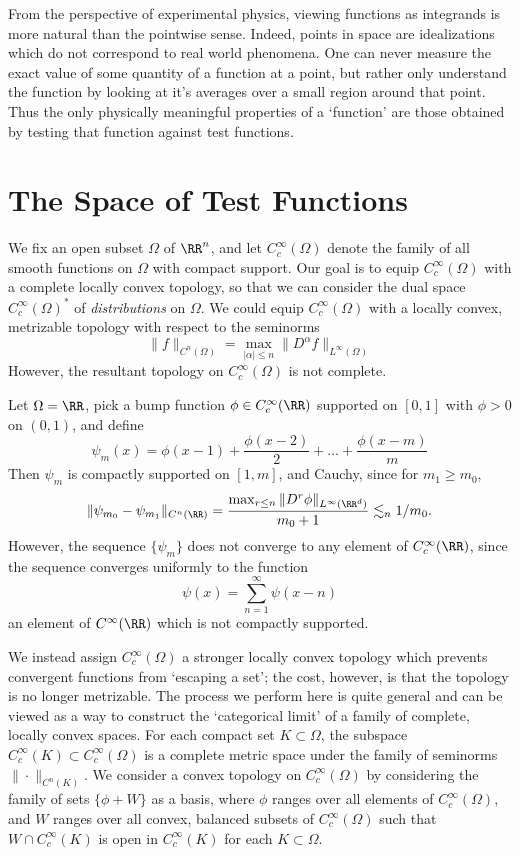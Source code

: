 \begin{remark}
  From the perspective of experimental physics, viewing functions as integrands is more natural than the pointwise sense. Indeed, points in space are idealizations which do not correspond to real world phenomena. One can never measure the exact value of some quantity of a function at a point, but rather only understand the function by looking at it's averages over a small region around that point. Thus the only physically meaningful properties of a `function' are those obtained by testing that function against test functions.
\end{remark}

\section{The Space of Test Functions}

We fix an open subset $\Omega$ of $\RR^n$, and let $C_c^\infty(\Omega)$ denote the family of all smooth functions on $\Omega$ with compact support. Our goal is to equip $C_c^\infty(\Omega)$ with a complete locally convex topology, so that we can consider the dual space $C_c^\infty(\Omega)^*$ of \emph{distributions} on $\Omega$. We could equip $C_c^\infty(\Omega)$ with a locally convex, metrizable topology with respect to the seminorms
%
\[ \| f \|_{C^n(\Omega)} = \max_{|\alpha| \leq n} \| D^\alpha f \|_{L^\infty(\Omega)} \]
%
However, the resultant topology on $C_c^\infty(\Omega)$ is not complete.

\begin{example}
    Let $\Omega = \RR$, pick a bump function $\phi \in C_c^\infty(\RR)$ supported on $[0,1]$ with $\phi > 0$ on $(0,1)$, and define
    \[ \psi_m(x) = \phi(x-1) + \frac{\phi(x-2)}{2} + \dots + \frac{\phi(x-m)}{m} \]
    Then $\psi_m$ is compactly supported on $[1,m]$, and Cauchy, since for $m_1 \geq m_0$,
    \[ \| \psi_{m_0} - \psi_{m_1} \|_{C^n(\RR)} = \frac{ \max_{r \leq n} \| D^r \phi \|_{L^\infty(\RR^d)}}{m_0+1} \lesssim_n 1/m_0. \]
    However, the sequence $\{ \psi_m \}$ does not converge to any element of $C_c^\infty(\RR)$, since the sequence converges uniformly to the function
    \[ \psi(x) = \sum_{n = 1}^\infty \psi(x-n) \]
    an element of $C^\infty(\RR)$ which is not compactly supported.
\end{example}

We instead assign $C_c^\infty(\Omega)$ a stronger locally convex topology which prevents convergent functions from `escaping a set'; the cost, however, is that the topology is no longer metrizable. The process we perform here is quite general and can be viewed as a way to construct the `categorical limit' of a family of complete, locally convex spaces. For each compact set $K \subset \Omega$, the subspace $C_c^\infty(K) \subset C_c^\infty(\Omega)$ is a complete metric space under the family of seminorms $\| \cdot \|_{C^n(K)}$. We consider a convex topology on $C_c^\infty(\Omega)$ by considering the family of sets $\{ \phi + W \}$ as a basis, where $\phi$ ranges over all elements of $C_c^\infty(\Omega)$, and $W$ ranges over all convex, balanced subsets of $C_c^\infty(\Omega)$ such that $W \cap C_c^\infty(K)$ is open in $C_c^\infty(K)$ for each $K \subset \Omega$.

